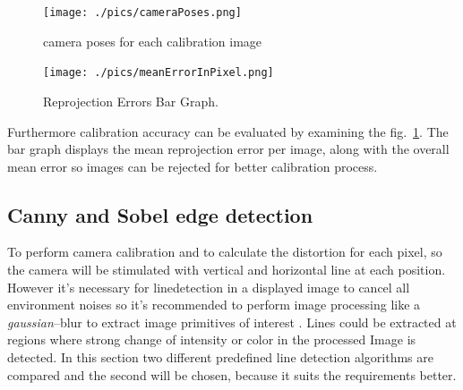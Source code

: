 \documentclass[journal,final,a4paper,twoside]{PS}
\begin{document}
\begin{figure}[h]
\centering
\parbox{4cm}{
\texttt{[image: ./pics/cameraPoses.png]}
\caption{camera poses for each calibration image~\cite{Corke}}
\label{fig:cameraPose}}
\qquad
\begin{minipage}{4cm}
\texttt{[image: ./pics/meanErrorInPixel.png]}
\caption{Reprojection Errors Bar Graph.}
\label{fig:ErrorsBarGraph}
\end{minipage}
\end{figure}

Furthermore calibration accuracy can be evaluated by examining the fig.~\ref{fig:ErrorsBarGraph}. The bar graph displays the mean reprojection error per image, along with the overall mean error \cite{matlab} so images can be rejected for better calibration process.

\subsection{Canny and Sobel edge detection}
\label{sec:Canny}
To perform camera calibration and to calculate the distortion for each pixel, so the camera will be stimulated with vertical and horizontal line at each position. However it's necessary for linedetection in a displayed image to cancel all environment noises so it's recommended to perform image processing like a \emph{gaussian}--blur to extract image primitives of interest \cite{opencv}. 
Lines could be extracted at regions where strong change of intensity or color in the processed Image is detected. In this section two different predefined line detection algorithms are compared and the second will be chosen, because it suits the requirements better\cite{Langaniere}.
\end{document}

